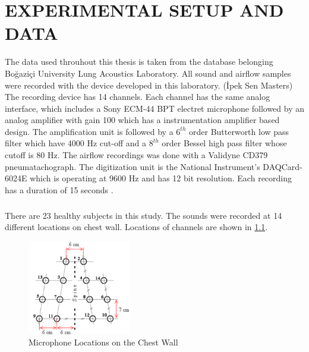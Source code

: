 \chapter{EXPERIMENTAL SETUP AND DATA}
\label{chp:exp-setup-data}
The data used throuhout this thesis is taken from the database belonging Boğaziçi University Lung Acoustics Laboratory. All sound and airflow samples were recorded with the device developed in this laboratory. (İpek Sen Masters) The recording device has 14 channels. Each channel has the same analog interface, which includes a Sony ECM-44 BPT electret microphone followed by an analog amplifier with gain 100 which has a instrumentation amplifier based design. The amplification unit is followed by a $6^{th}$ order Butterworth low pass filter which have 4000 Hz cut-off and a $8^{th}$ order Bessel high pass filter whose cutoff is 80 Hz. The airflow recordings was done with a Validyne CD379 pneumatachograph. The digitization unit is the National Instrument's DAQCard-6024E which is operating at 9600 Hz and has 12 bit resolution. Each recording has a duration of 15 seconds \cite{ipek-device}.
\paragraph{} There are 23 healthy subjects in this study. The sounds were recorded at 14 different locations on chest wall. Locations of channels are shown in \ref{fig:mic_loc}.
\begin{figure}
	\begin{center}
		\includegraphics[width=0.4\textwidth]{figures/mic_loc.png}
		\caption{Microphone Locations on the Chest Wall \cite{ipek-phd-2}}
		\label{fig:mic_loc}
	\end{center}
\end{figure} \par